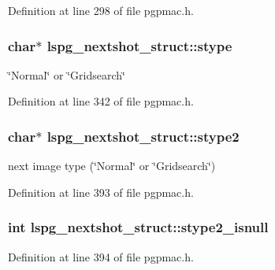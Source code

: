 Definition at line 298 of file pgpmac.\-h.

\hypertarget{structlspg__nextshot__struct_ab5a70b189c2fe516ca0c84bd06f3e564}{
\subsubsection[{stype}]{\setlength{\rightskip}{0pt plus 5cm}char$\ast$ lspg\-\_\-nextshot\-\_\-struct\-::stype}}\label{structlspg__nextshot__struct_ab5a70b189c2fe516ca0c84bd06f3e564}


\char`\"{}\-Normal\char`\"{} or \char`\"{}\-Gridsearch\char`\"{} 



Definition at line 342 of file pgpmac.\-h.

\hypertarget{structlspg__nextshot__struct_ae08ef74ea76e6e099a3ff6c7f845d337}{
\subsubsection[{stype2}]{\setlength{\rightskip}{0pt plus 5cm}char$\ast$ lspg\-\_\-nextshot\-\_\-struct\-::stype2}}\label{structlspg__nextshot__struct_ae08ef74ea76e6e099a3ff6c7f845d337}


next image type (\char`\"{}\-Normal\char`\"{} or \char`\"{}\-Gridsearch\char`\"{}) 



Definition at line 393 of file pgpmac.\-h.

\hypertarget{structlspg__nextshot__struct_a203e29ed0bb403aaab6d7f95f690cc0d}{
\subsubsection[{stype2\-\_\-isnull}]{\setlength{\rightskip}{0pt plus 5cm}int lspg\-\_\-nextshot\-\_\-struct\-::stype2\-\_\-isnull}}\label{structlspg__nextshot__struct_a203e29ed0bb403aaab6d7f95f690cc0d}


Definition at line 394 of file pgpmac.\-h.

